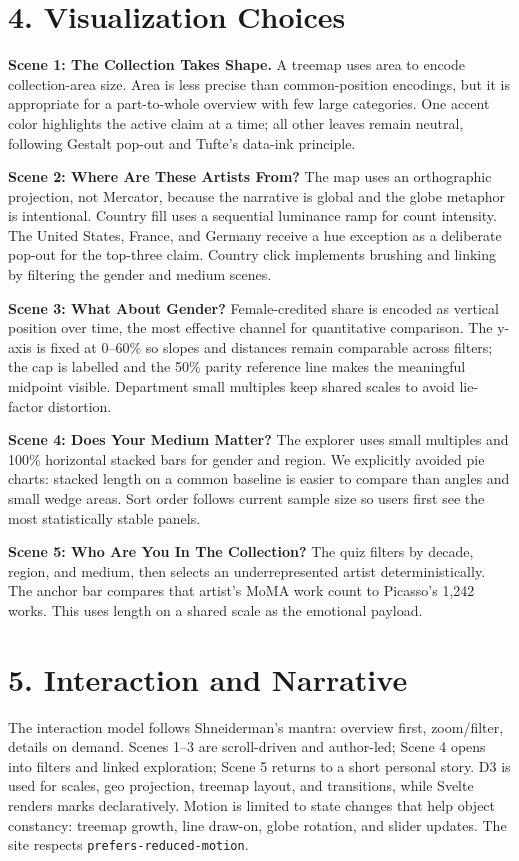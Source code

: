 \documentclass[10pt,a4paper]{article}
\newcommand{\scene}[1]{\textbf{\textcolor{DartsRed}{#1}}}
\begin{document}
\section*{4. Visualization Choices}
\textbf{\scene{Scene 1: The Collection Takes Shape.}} A treemap uses area to encode collection-area size. Area is less precise than common-position encodings, but it is appropriate for a part-to-whole overview with few large categories. One accent color highlights the active claim at a time; all other leaves remain neutral, following Gestalt pop-out and Tufte's data-ink principle.

\textbf{\scene{Scene 2: Where Are These Artists From?}} The map uses an orthographic projection, not Mercator, because the narrative is global and the globe metaphor is intentional. Country fill uses a sequential luminance ramp for count intensity. The United States, France, and Germany receive a hue exception as a deliberate pop-out for the top-three claim. Country click implements brushing and linking by filtering the gender and medium scenes.

\textbf{\scene{Scene 3: What About Gender?}} Female-credited share is encoded as vertical position over time, the most effective channel for quantitative comparison. The y-axis is fixed at 0--60\% so slopes and distances remain comparable across filters; the cap is labelled and the 50\% parity reference line makes the meaningful midpoint visible. Department small multiples keep shared scales to avoid lie-factor distortion.

\textbf{\scene{Scene 4: Does Your Medium Matter?}} The explorer uses small multiples and 100\% horizontal stacked bars for gender and region. We explicitly avoided pie charts: stacked length on a common baseline is easier to compare than angles and small wedge areas. Sort order follows current sample size so users first see the most statistically stable panels.

\textbf{\scene{Scene 5: Who Are You In The Collection?}} The quiz filters by decade, region, and medium, then selects an underrepresented artist deterministically. The anchor bar compares that artist's MoMA work count to Picasso's 1,242 works. This uses length on a shared scale as the emotional payload.

\section*{5. Interaction and Narrative}
The interaction model follows Shneiderman's mantra: overview first, zoom/filter, details on demand. Scenes 1--3 are scroll-driven and author-led; Scene 4 opens into filters and linked exploration; Scene 5 returns to a short personal story. D3 is used for scales, geo projection, treemap layout, and transitions, while Svelte renders marks declaratively. Motion is limited to state changes that help object constancy: treemap growth, line draw-on, globe rotation, and slider updates. The site respects \texttt{prefers-reduced-motion}.
\end{document}
